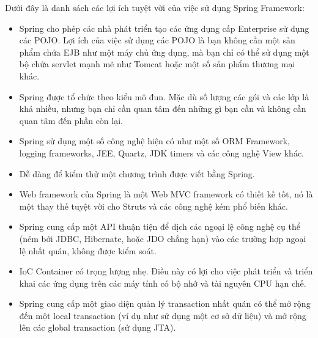 Dưới đây là danh sách các lợi ích tuyệt vời của việc sử dụng Spring Framework:
\begin{itemize}
    \item Spring cho phép các nhà phát triển tạo các ứng dụng cấp Enterprise sử dụng các POJO. Lợi ích của việc sử dụng các POJO là bạn không cần một sản phẩm chứa EJB như một máy chủ ứng dụng, mà bạn chỉ có thể sử dụng một bộ chứa servlet mạnh mẽ như Tomcat hoặc một số sản phẩm thương mại khác.
    \item Spring được tổ chức theo kiểu mô đun. Mặc dù số lượng các gói và các lớp là khá nhiều, nhưng bạn chỉ cần quan tâm đến những gì bạn cần và không cần quan tâm đến phần còn lại.
    \item Spring sử dụng một số công nghệ hiện có như một số ORM Framework, logging frameworks, JEE, Quartz, JDK timers và các công nghệ View khác.
    \item Dễ dàng để kiểm thử một chương trình được viết bằng Spring.
    \item Web framework của Spring là một Web MVC framework có thiết kế tốt, nó là một thay thế tuyệt vời cho Struts và các công nghệ kém phổ biến khác.
    \item Spring cung cấp một API thuận tiện để dịch các ngoại lệ công nghệ cụ thể (ném bởi JDBC, Hibernate, hoặc JDO chẳng hạn) vào các trường hợp ngoại lệ nhất quán, không được kiểm soát.
    \item IoC Container có trọng lượng nhẹ. Điều này có lợi cho việc phát triển và triển khai các ứng dụng trên các máy tính có bộ nhớ và tài nguyên CPU hạn chế.
    \item Spring cung cấp một giao diện quản lý transaction nhất quán có thể mở rộng đến một local transaction (ví dụ như sử dụng một cơ sở dữ liệu) và mở rộng lên các global transaction (sử dụng JTA).
\end{itemize}